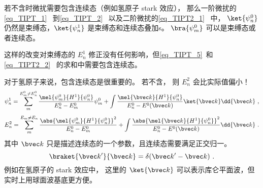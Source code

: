 
\begin{issues}
\issueDraft
\end{issues}


若不含时微扰需要包含连续态（例如氢原子 stark 效应）， 那么一阶微扰的\autoref{eq_TIPT_1}~ 到\autoref{eq_TIPT_2}~ 以及二阶微扰的\autoref{eq_TIPT2_1}~ 中， $\ket{\psi_n^0}$ 仍然是束缚态，$\ket{\psi_n^1}$ 是束缚态和连续态叠加s。 $\bra{\psi_m^0}$ 可以是束缚态或者连续态。

这样的改变对束缚态的 $E_n^1$ 修正没有任何影响，但\autoref{eq_TIPT_5}~和\autoref{eq_TIPT2_2}~ 的求和中需要包含连续态。

对于氢原子来说，包含连续态是很重要的。 若不含， 则 $E_n^2$ 会比实际值偏小！
\begin{equation}
\psi_n^1 = \sum_m^{E_m^0 \ne E_n^0} \frac{\mel{\psi_m^0}{H^1}{\psi_n^0}}{E_n^0 - E_m^0} \psi_m^0
+ \int \frac{\mel{\bvec k}{H^1}{\psi_n^0}}{E_n^0 - E^0(\bvec k)} \ket{\bvec k}\dd{\bvec k}~,
\end{equation}
%
\begin{equation}
E_n^2 = \sum_{m}^{E_m\ne E_n} \frac{\abs{\mel{\psi_m^0}{H^1}{\psi_n^0}}^2}{E_n^0-E_m^0}
+ \int \frac{\abs{\mel{\bvec k}{H^1}{\psi_n^0}}^2}{E_n^0-E^0(\bvec k)}\dd{\bvec k}~.
\end{equation}
其中 $\bvec k$ 只是描述连续态的一个参数，且连续态需要满足正交归一。
\begin{equation}
\braket{\bvec k'}{\bvec k} = \delta(\bvec k'-\bvec k)~.
\end{equation}
例如在氢原子的 stark 效应中， 这里的 $\ket{\bvec k}$ 可以表示库仑平面波，但实时上用球面波基底更方便。
